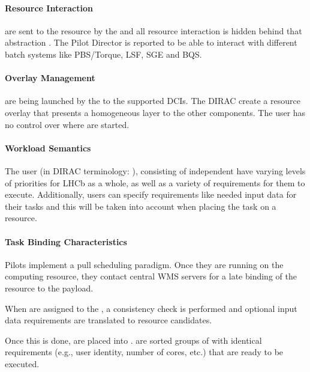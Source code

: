 \documentclass{sig-alternate}
\begin{document}
\paragraph{Resource Interaction}

\pilots are sent to the resource by the  and all
resource interaction is hidden behind that abstraction . The
Pilot Director is reported  to be able to interact with different
batch systems like PBS/Torque, LSF, SGE and BQS.

\paragraph{Overlay Management}

\pilots are being launched by the  to the supported
DCIs. The DIRAC \pilots create a resource overlay that presents a homogeneous
layer to the other components. The user has no control over where \pilots are
started.

\paragraph{Workload Semantics}

The user  (in DIRAC terminology: ),
consisting of independent  have varying levels of priorities for
LHCb as a whole, as well as a variety of requirements for them to execute.
Additionally, users can specify requirements like needed input data for their
tasks and this will be taken into account when placing the task on a
resource.

\paragraph{Task Binding Characteristics}

Pilots implement a pull scheduling paradigm. Once they are running on the
computing resource, they contact central WMS servers for a late binding of the
resource to the payload.

When  are assigned to the , a consistency check is
performed and optional input data requirements are
translated to resource candidates.

Once this is done,  are placed into .
 are sorted groups of  with identical
requirements (e.g., user identity, number of cores, etc.) that are ready to be
executed.
\end{document}

